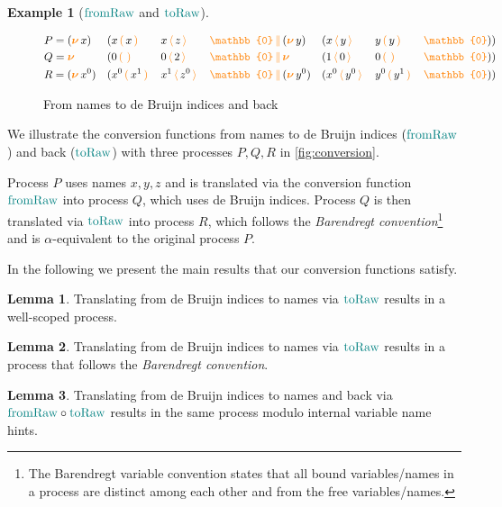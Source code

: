 \documentclass[sigplan,10pt,anonymous,review]{acmart}
\theoremstyle{definition}
\newtheorem{nilemma}{Lemma}
\newtheorem{example}{Example}
\newcommand{\constr}[1]{\textcolor{orange}{\operatorname{#1}}}
\newcommand{\func}[1]{\textcolor{teal}{\operatorname{#1}}}
\newcommand{\PO}{\constr{\mathbb{0}}}
\newcommand{\comp}[2]{#1 \, \constr{\parallel} \, #2}
\newcommand{\new}{\constr{\boldsymbol{\nu}} \,}
\newcommand{\send}[2]{#1 \, \constr{\langle} \, #2 \,\constr{\rangle} \,}
\newcommand{\recv}[2]{#1 \, \constr{\mathbb{(}} \, #2 \, \constr{\mathbb{)}} \,}
\begin{document}
\begin{example}[$\func{fromRaw}$ and $\func{toRaw}$]
  \begin{figure}[t]
    \begin{alignat*}{7}
      &P = (\new{x} ) && (\comp {\recv{x}{x} && \send{x}{z} && \PO} {(\new{y}) && (\send{x}{y} && \recv{y}{y} && \PO)}) \\
      &Q = \new{} && (\comp {\recv{0}{} && \send{0}{2} && \PO} {\new{} && (\send{1}{0} && \recv{0}{} && \PO)}) \\
      &R = (\new{x^0} ) && (\comp {\recv{x^0}{x^1} && \send{x^1}{z^0} && \PO} {(\new{y^0}) && (\send{x^0}{y^0} && \recv{y^0}{y^1} && \PO)})
    \end{alignat*}
    \caption{From names to de Bruijn indices and back}
    \label{fig:conversion}
    \end{figure}
  We illustrate the conversion functions from names to de Bruijn indices $(\func{fromRaw}$) and back ($\func{toRaw}$) with three processes $P,Q,R$  in \autoref{fig:conversion}.

  Process $P$ uses names $x,y,z$ and is translated via the conversion function $\func{fromRaw}$ into process $Q$, which uses de Bruijn indices.
  Process $Q$ is then translated via $\func{toRaw}$ into process $R$, which follows the \emph{Barendregt convention}\footnote{The Barendregt variable convention states that all bound variables/names in a process are distinct among each other and from the free variables/names.} and is $\alpha$-equivalent to the original process $P$.
\end{example}

In the following we present the main results that our conversion functions satisfy.

\begin{nilemma}
  Translating from de Bruijn indices to names via $\func{toRaw}$ results in a well-scoped process.
\end{nilemma}

\begin{nilemma}
  Translating from de Bruijn indices to names via $\func{toRaw}$ results in a process that follows the \emph{Barendregt convention}.
\end{nilemma}

\begin{nilemma}
  Translating from de Bruijn indices to names and back via $\func{fromRaw} \circ \func{toRaw}$ results in the same process modulo internal variable name hints.
\end{nilemma}
\end{document}
